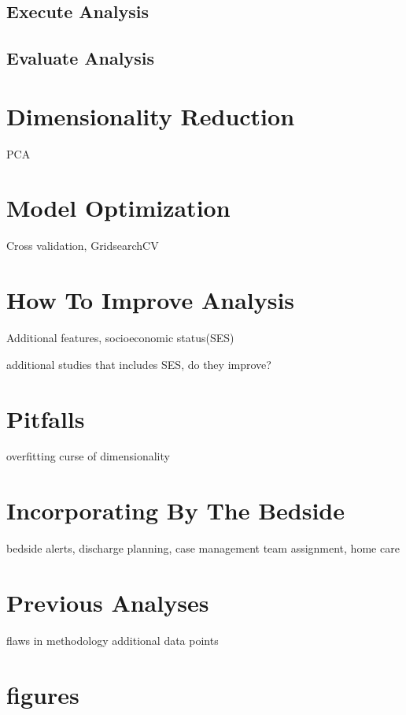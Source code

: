 \documentclass[sigconf]{acmart}
\begin{document}
\subsection{Execute Analysis}

\subsection{Evaluate Analysis}



\section{Dimensionality Reduction}

PCA

\section{Model Optimization}

Cross validation, GridsearchCV

\section{How To Improve Analysis}

Additional features, socioeconomic status(SES)

additional studies that includes SES, do they improve?

\section{Pitfalls}

overfitting
curse of dimensionality

\section{Incorporating By The Bedside}
bedside alerts, discharge planning, case management team assignment, home care

\section{Previous Analyses}

flaws in methodology
additional data points

\section{figures}
\end{document}
